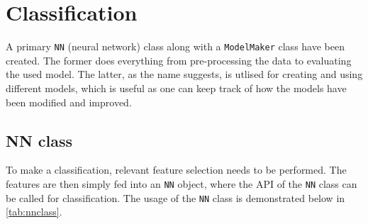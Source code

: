 \section{Classification}
A primary \verb|NN| (neural network) class along with a \verb|ModelMaker| class have been created. The former does everything from pre-processing the data to evaluating the used model. The latter, as the name suggests, is utlised for creating and using different models, which is useful as one can keep track of how the models have been modified and improved. 

\subsection{NN class}
To make a classification, relevant feature selection needs to be performed. The features are then simply fed into an \verb|NN| object, where the API of the \verb|NN| class can be called for classification. The usage of the \verb|NN| class is demonstrated below in \ref{tab:nnclass}.

